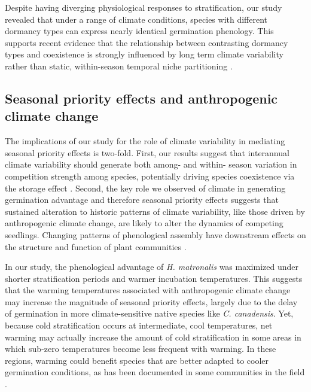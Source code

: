 \documentclass{article}[11pt]
\begin{document}

Despite having diverging physiological responses to stratification, our study revealed that under a range of climate conditions, species with different dormancy types can express nearly identical germination phenology. This supports recent evidence that the relationship between contrasting dormancy types and coexistence is strongly influenced by long term climate variability rather than static, within-season temporal niche partitioning \citep{Shriver:2017ud,CHESSON:1993vx}.

\subsection*{Seasonal priority effects and anthropogenic climate change}
The implications of our study for the role of climate variability in mediating seasonal priority effects is two-fold. First, our results suggest that interannual climate variability should generate both among- and within- season variation in competition strength among species, potentially driving species coexistence via the storage effect \citep{Chesson:2003ve}. Second, the key role we observed of climate in generating germination advantage and therefore seasonal priority effects suggests that sustained alteration to historic patterns of climate variability, like those driven by anthropogenic climate change, are likely to alter the dynamics of competing seedlings. Changing patterns of phenological assembly have downstream effects on the structure and function of plant communities \citep{Yang:2010ta,Piao:2019wd}.

In our study, the phenological advantage of \textit{H. matronalis} was maximized under shorter stratification periods and warmer incubation temperatures. This suggests that the warming temperatures associated with anthropogenic climate change may increase the magnitude of seasonal priority effects, largely due to the delay of germination in more climate-sensitive native species like \textit{C. canadensis}. Yet, because cold stratification occurs at intermediate, cool temperatures, net warming may actually increase the amount of cold stratification in some areas in which sub-zero temperatures become less frequent with warming. In these regions, warming could benefit species that are better adapted to cooler germination conditions, as has been documented in some communities in the field \citep{KIMBALL:2010vg}.
\end{document}
